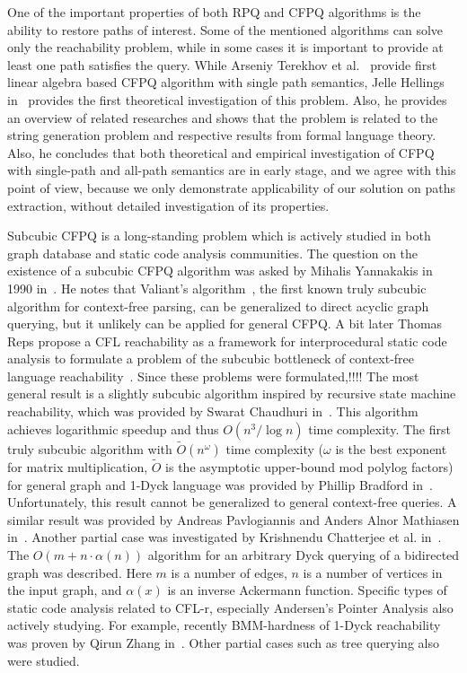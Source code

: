 One of the important properties of both RPQ and CFPQ algorithms is the ability to restore paths of interest. 
Some of the mentioned algorithms can solve only the reachability problem, while in some cases it is important to provide at least one path satisfies the query. 
While Arseniy Terekhov et al.~\cite{10.1145/3398682.3399163} provide first linear algebra based CFPQ algorithm with single path semantics, Jelle Hellings in~\cite{!!!} provides the first theoretical investigation of this problem. Also, he provides an overview of related researches and shows that the problem is related to the string generation problem and respective results from formal language theory.
Also, he concludes that both theoretical and empirical investigation of CFPQ with single-path and all-path semantics are in early stage, and we agree with this point of view, because we only demonstrate applicability of our solution on paths extraction, without detailed investigation of its properties.

Subcubic CFPQ is a long-standing problem which is actively studied in both graph database and static code analysis communities.
The question on the existence of a subcubic CFPQ algorithm was asked by Mihalis Yannakakis in 1990 in~\cite{Yannakakis}.
He notes that Valiant's algorithm~\cite{10.1016/S0022-0000(75)80046-8}, the first known truly subcubic algorithm for context-free parsing, can be generalized to direct acyclic graph querying, but it unlikely can be applied for general CFPQ. 
A bit later Thomas Reps propose a CFL reachability as a framework for interprocedural static code analysis to formulate a problem of the subcubic bottleneck of context-free language reachability~\cite{!!!}.
Since these problems were formulated,!!!!
The most general result is a slightly subcubic algorithm inspired by recursive state machine reachability, which was provided by Swarat Chaudhuri in~\cite{10.1145/1328897.1328460}.
This algorithm achieves logarithmic speedup and thus $O(n^3/\log{n})$ time complexity. 
The first truly subcubic algorithm with $\widetilde{O}(n^\omega)$ time complexity ($\omega$ is the best exponent for matrix multiplication, $\widetilde{O}$ is the asymptotic upper-bound mod polylog factors) for general graph and 1-Dyck language was provided by Phillip Bradford in~\cite{Bradford2017EfficientEP}. Unfortunately, this result cannot be generalized to general context-free queries.
A similar result was provided by Andreas Pavlogiannis and Anders Alnor Mathiasen in~\cite{pavlogiannis2020finegrained}.
Another partial case was investigated by Krishnendu Chatterjee et al. in~\cite{10.1145/3158118}.
The $O(m + n \cdot \alpha(n))$ algorithm for an arbitrary Dyck querying of a bidirected graph was described. Here $m$ is a number of edges, $n$ is a number of vertices in the input graph, and $\alpha(x)$ is an inverse Ackermann function.
Specific types of static code analysis related to CFL-r, especially Andersen's Pointer Analysis also actively studying.
For example, recently BMM-hardness of 1-Dyck reachability was proven by	Qirun Zhang in~\cite{zhang2020conditional}.
Other partial cases such as tree querying also were studied.

